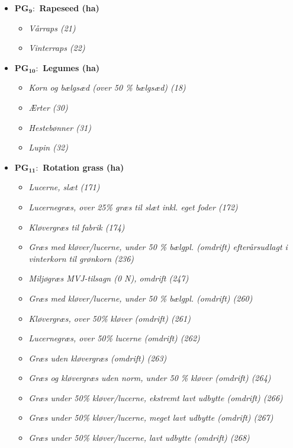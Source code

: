 \documentclass[12pt]{article}
\begin{document}
\begin{itemize}
    \item[] \textbf{PG$_\textbf{9}:$ Rapeseed (ha)}
    \begin{itemize}
        \item[$+$] \textit{Vårraps (21)}
        \item[$+$] \textit{Vinterraps (22)}
    \end{itemize}
    \item[] \textbf{PG$_{\textbf{10}}:$ Legumes (ha)}
    \begin{itemize}
        \item[$+$] \textit{Korn og bælgsæd (over 50 \% bælgsæd) (18)}
        \item[$+$] \textit{Ærter (30)}
        \item[$+$] \textit{Hestebønner (31)}
        \item[$+$] \textit{Lupin (32)}
    \end{itemize}
    \item[] \textbf{PG$_{\textbf{11}}:$ Rotation grass (ha)}
    \begin{itemize}
        \item[$+$] \textit{Lucerne, slæt (171)}
        \item[$+$] \textit{Lucernegræs, over 25\% græs til slæt inkl. eget foder (172)}
        \item[$+$] \textit{Kløvergræs til fabrik (174)}
        \item[$+$] \textit{Græs med kløver/lucerne, under 50 \% bælgpl. (omdrift) efterårsudlagt i vinterkorn til grønkorn (236)}
        \item[$+$] \textit{Miljøgræs MVJ-tilsagn (0 N), omdrift (247)}
        \item[$+$] \textit{Græs med kløver/lucerne, under 50 \% bælgpl. (omdrift) (260)}
        \item[$+$] \textit{Kløvergræs, over 50\% kløver (omdrift) (261)}
        \item[$+$] \textit{Lucernegræs, over 50\% lucerne (omdrift) (262)}
        \item[$+$] \textit{Græs uden kløvergræs (omdrift) (263)}
        \item[$+$] \textit{Græs og kløvergræs uden norm, under 50 \% kløver (omdrift) (264)}
        \item[$+$] \textit{Græs under 50\% kløver/lucerne, ekstremt lavt udbytte (omdrift) (266)}
        \item[$+$] \textit{Græs  under 50\% kløver/lucerne, meget lavt udbytte (omdrift) (267)}
        \item[$+$] \textit{Græs under 50\% kløver/lucerne, lavt udbytte (omdrift) (268)}

\end{itemize}
\end{itemize}
\end{document}
